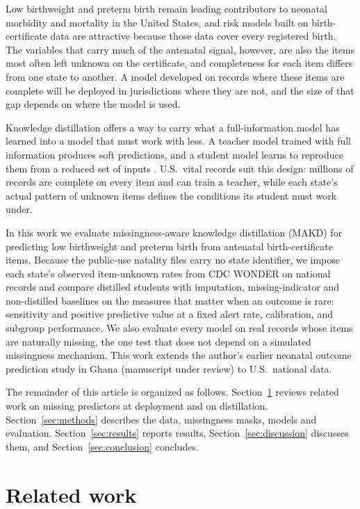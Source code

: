 \documentclass[11pt]{article}
\begin{document}
Low birthweight and preterm birth remain leading contributors to neonatal morbidity and mortality in the United States, and risk models built on birth-certificate data are attractive because those data cover every registered birth. The variables that carry much of the antenatal signal, however, are also the items most often left unknown on the certificate, and completeness for each item differs from one state to another. A model developed on records where these items are complete will be deployed in jurisdictions where they are not, and the size of that gap depends on where the model is used.

Knowledge distillation offers a way to carry what a full-information model has learned into a model that must work with less. A teacher model trained with full information produces soft predictions, and a student model learns to reproduce them from a reduced set of inputs \citep{hinton2015}. U.S.\ vital records suit this design: millions of records are complete on every item and can train a teacher, while each state's actual pattern of unknown items defines the conditions its student must work under.

In this work we evaluate missingness-aware knowledge distillation (MAKD) for predicting low birthweight and preterm birth from antenatal birth-certificate items. Because the public-use natality files carry no state identifier, we impose each state's observed item-unknown rates from CDC WONDER on national records and compare distilled students with imputation, missing-indicator and non-distilled baselines on the measures that matter when an outcome is rare: sensitivity and positive predictive value at a fixed alert rate, calibration, and subgroup performance. We also evaluate every model on real records whose items are naturally missing, the one test that does not depend on a simulated missingness mechanism. This work extends the author's earlier neonatal outcome prediction study in Ghana (manuscript under review) to U.S.\ national data.

The remainder of this article is organized as follows. Section~\ref{sec:related} reviews related work on missing predictors at deployment and on distillation. Section~\ref{sec:methods} describes the data, missingness masks, models and evaluation. Section~\ref{sec:results} reports results, Section~\ref{sec:discussion} discusses them, and Section~\ref{sec:conclusion} concludes.

\section{Related work}\label{sec:related}
\end{document}
